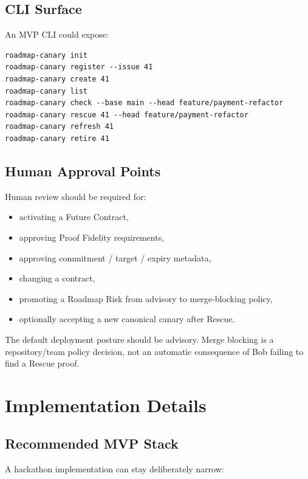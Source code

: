 \documentclass[12pt]{article}
\begin{document}
\subsection{CLI Surface}

An MVP CLI could expose:

\begin{lstlisting}
roadmap-canary init
roadmap-canary register --issue 41
roadmap-canary create 41
roadmap-canary list
roadmap-canary check --base main --head feature/payment-refactor
roadmap-canary rescue 41 --head feature/payment-refactor
roadmap-canary refresh 41
roadmap-canary retire 41
\end{lstlisting}

\subsection{Human Approval Points}

Human review should be required for:

\begin{itemize}
    \item activating a Future Contract,
    \item approving Proof Fidelity requirements,
    \item approving commitment / target / expiry metadata,
    \item changing a contract,
    \item promoting a Roadmap Risk from advisory to merge-blocking policy,
    \item optionally accepting a new canonical canary after Rescue.
\end{itemize}

The default deployment posture should be advisory. Merge blocking is a repository/team policy decision, not an automatic consequence of Bob failing to find a Rescue proof.

\section{Implementation Details}

\subsection{Recommended MVP Stack}

A hackathon implementation can stay deliberately narrow:
\end{document}
